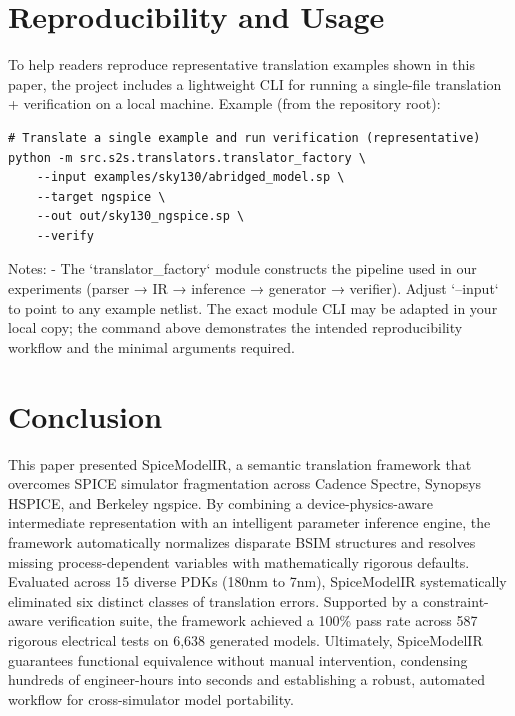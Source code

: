 \documentclass[conference]{IEEEtran}
\begin{document}
\section{Reproducibility and Usage}
\label{sec:repro}
To help readers reproduce representative translation examples shown in this paper, the project includes a lightweight CLI for running a single-file translation + verification on a local machine. Example (from the repository root):
\begin{verbatim}
# Translate a single example and run verification (representative)
python -m src.s2s.translators.translator_factory \
    --input examples/sky130/abridged_model.sp \
    --target ngspice \
    --out out/sky130_ngspice.sp \
    --verify
\end{verbatim}
Notes:
- The `translator_factory` module constructs the pipeline used in our experiments (parser → IR → inference → generator → verifier). Adjust `--input` to point to any example netlist. The exact module CLI may be adapted in your local copy; the command above demonstrates the intended reproducibility workflow and the minimal arguments required.

\section{Conclusion}
\label{sec:conclusion}
This paper presented SpiceModelIR, a semantic translation framework that overcomes SPICE simulator fragmentation across Cadence Spectre, Synopsys HSPICE, and Berkeley ngspice. By combining a device-physics-aware intermediate representation with an intelligent parameter inference engine, the framework automatically normalizes disparate BSIM structures and resolves missing process-dependent variables with mathematically rigorous defaults. Evaluated across 15 diverse PDKs (180nm to 7nm), SpiceModelIR systematically eliminated six distinct classes of translation errors. Supported by a constraint-aware verification suite, the framework achieved a 100\% pass rate across 587 rigorous electrical tests on 6,638 generated models. Ultimately, SpiceModelIR guarantees functional equivalence without manual intervention, condensing hundreds of engineer-hours into seconds and establishing a robust, automated workflow for cross-simulator model portability.
\end{document}
